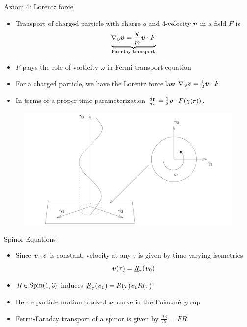 \documentclass[aspectratio=169]{beamer}
\begin{document}
\begin{frame}{Axiom 4: Lorentz force}
\vfill
\begin{itemize}
	\item Transport of charged particle with charge $q$ and 4-velocity $\boldsymbol{v}$ in a field $F$ is
	    \[
	    \underbrace{\nabla_{\boldsymbol{v}}\boldsymbol{v} = \frac{q}{m} \boldsymbol{v} \cdot F}_{\textrm{Faraday transport}}
	    \]
	\item $F$ plays the role of vorticity $\omega$ in Fermi transport equation
\end{itemize}
\vfill
\end{frame}

\begin{frame}{}
    \vfill
    \begin{itemize}
        \item For a charged particle, we have the Lorentz force law $\nabla_{\boldsymbol{v}}\boldsymbol{v} = \frac{1}{2} \boldsymbol{v}\cdot F$
        \item In terms of a proper time parameterization $\frac{d\boldsymbol{v}}{d\tau} = \frac{1}{2} \boldsymbol{v} \cdot F(\gamma(\tau))$.
    \end{itemize}
    \begin{figure}
        \centering
        \includegraphics[width=.65\textwidth]{figures/helical_path.png}
    \end{figure}
    \vfill
\end{frame}

\begin{frame}{Spinor Equations}
    \vfill

    \begin{itemize}
        \item Since $\boldsymbol{v}\cdot\boldsymbol{v}$ is constant, velocity at any $\tau$ is given by time varying isometries
    \[
    \boldsymbol{v}(\tau)=\underline{R}_\tau(\boldsymbol{v}_0)
    \]
    \item $R \in \mathrm{Spin}(1,3)$ induces $\underline{R}_\tau(\boldsymbol{v}_0)=R(\tau)\boldsymbol{v}_0 R(\tau)^\dagger$
    \item Hence particle motion tracked as curve in the Poincar\'e group 
    \item Fermi-Faraday transport of a spinor is given by $\frac{dR}{d\tau} = FR$
    \end{itemize}
    \vfill
\end{frame}
\end{document}
